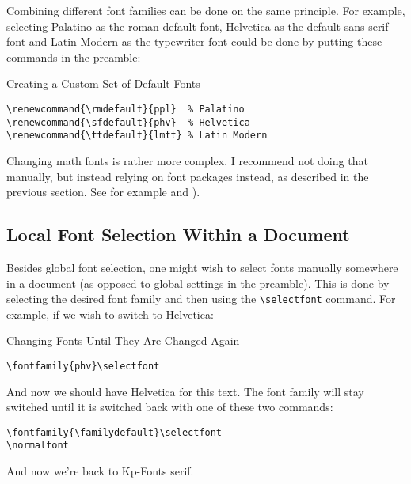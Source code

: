 \documentclass[a4paper,oneside,11pt]{article}
\newcommand\comm[1]{\texttt{\textbackslash#1}}
\begin{document}
Combining different  font families  can be  done on  the same  principle.  For
example,  selecting Palatino  as  the  roman default  font,  Helvetica as  the
default sans-serif font and Latin Modern  as the typewriter font could be done
by putting these commands in the preamble:

\begin{titled-frame}
{\textsf{Creating a Custom Set of Default Fonts}}
\vspace{-1em}
\begin{verbatim}
\renewcommand{\rmdefault}{ppl}  % Palatino
\renewcommand{\sfdefault}{phv}  % Helvetica
\renewcommand{\ttdefault}{lmtt} % Latin Modern
\end{verbatim}
\vspace{-1em}
\end{titled-frame}

Changing  math  fonts is  rather  more  complex. I  recommend not  doing  that
manually,  but  instead  relying  on   font  packages  instead,  as  described
in  the  previous  section. See for  example  \cite{stackexch:math-fonts}  and
\cite{practex:fonts}).


\subsection{Local Font Selection Within a Document}
\label{subsec:fontsel:local}

Besides  global  font selection,  one  might  wish  to select  fonts  manually
somewhere in a document (as opposed  to global settings in the preamble). This
is   done  by   selecting  the   desired  font family  and   then  using   the
\comm{selectfont} command. For example, if we wish to switch to Helvetica:

\begin{titled-frame}
{\textsf{Changing Fonts Until They Are Changed Again}}
\vspace{-1em}
\begin{verbatim}
\fontfamily{phv}\selectfont
\end{verbatim}


\selectfont  And  now  we   should  have  Helvetica  for  this
text. The font family will stay switched until it is switched back with one of
these two commands:

\begin{verbatim}
\fontfamily{\familydefault}\selectfont
\normalfont
\end{verbatim}
\normalfont And now we're back to Kp-Fonts serif.
\end{titled-frame}
\end{document}
